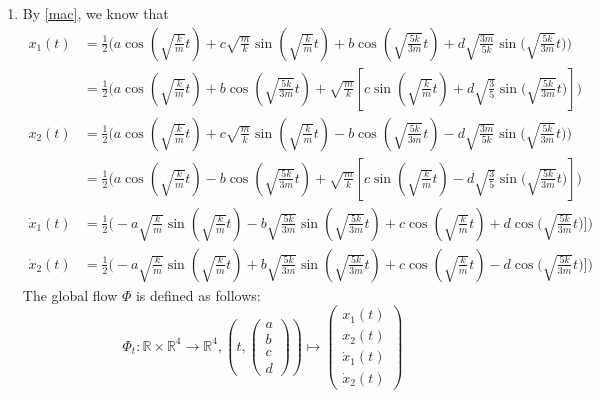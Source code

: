 \documentclass{article}
\theoremstyle{named}
\begin{document}
\begin{enumerate}[label=(\roman*)]
 	 \item By \eqref{mac}, we know that
 	 \begin{align*}
	 	 x_1(t) &= \frac{1}{2}\Big(a  \cos{(\sqrt{\frac{k}{m}}t)} + c\sqrt{\frac{m}{k}} \sin{(\sqrt{\frac{k}{m}}t)}  + b  \cos{(\sqrt{\frac{5k}{3m}}t)} + d\sqrt{\frac{3m}{5k}} \sin{(\sqrt{\frac{5k}{3m}}t})\Big) \\
	 	 &=\frac{1}{2}\Big(a  \cos{(\sqrt{\frac{k}{m}}t)} + b  \cos{(\sqrt{\frac{5k}{3m}}t)} + \sqrt{\frac{m}{k}} [c\sin{(\sqrt{\frac{k}{m}}t)}   + d\sqrt{\frac{3}{5}} \sin{(\sqrt{\frac{5k}{3m}}t})]\Big) \\
	 	 x_2(t) &= \frac{1}{2}\Big(a  \cos{(\sqrt{\frac{k}{m}}t)} + c\sqrt{\frac{m}{k}} \sin{(\sqrt{\frac{k}{m}}t)}  - b  \cos{(\sqrt{\frac{5k}{3m}}t)} - d\sqrt{\frac{3m}{5k}} \sin{(\sqrt{\frac{5k}{3m}}t})\Big) \\
	 	 &= \frac{1}{2}\Big(a  \cos{(\sqrt{\frac{k}{m}}t)} - b  \cos{(\sqrt{\frac{5k}{3m}}t)} + \sqrt{\frac{m}{k}} [c\sin{(\sqrt{\frac{k}{m}}t)}   - d\sqrt{\frac{3}{5}} \sin{(\sqrt{\frac{5k}{3m}}t})]\Big) \\
	 	 \dot x_1(t) &= \frac{1}{2}\Big(-a\sqrt{\frac{k}{m}}  \sin{(\sqrt{\frac{k}{m}}t)} - b\sqrt{\frac{5k}{3m}}  \sin{(\sqrt{\frac{5k}{3m}}t)} + c\cos{(\sqrt{\frac{k}{m}}t)}   + d \cos{(\sqrt{\frac{5k}{3m}}t})]\Big) \\
	 	 \dot x_2(t) &= \frac{1}{2}\Big(-a\sqrt{\frac{k}{m}}  \sin{(\sqrt{\frac{k}{m}}t)} + b\sqrt{\frac{5k}{3m}}  \sin{(\sqrt{\frac{5k}{3m}}t)} + c\cos{(\sqrt{\frac{k}{m}}t)}   - d \cos{(\sqrt{\frac{5k}{3m}}t})]\Big)
 	 \end{align*}
 	 The global flow $\Phi$ is defined as follows:
 	 \[
 	 	\Phi_t: \mathbb R \times \mathbb R^4 \to \mathbb R^4, (t,\begin{pmatrix}
 	 	a \\ b \\ c \\ d 
 	 	\end{pmatrix}) \mapsto \begin{pmatrix}
 	 	x_1(t) \\ x_2(t) \\ \dot x_1(t) \\ \dot x_2(t)
 	 	\end{pmatrix}
 	 \]
\end{enumerate}
\end{document}

